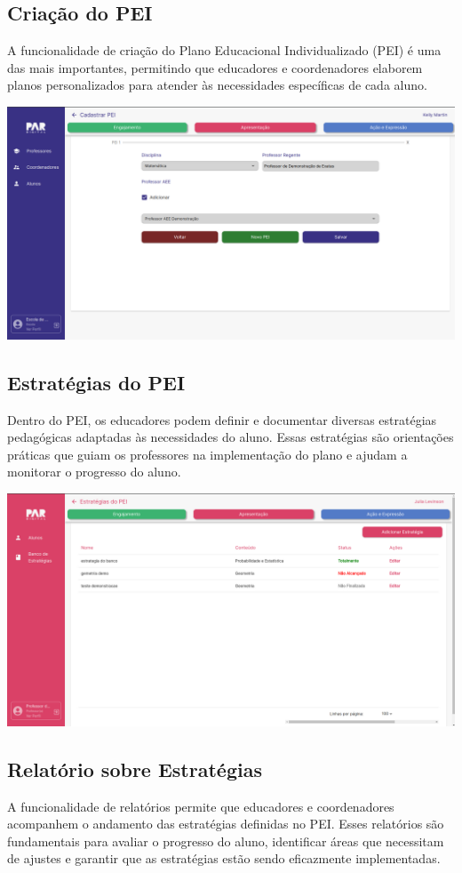 \documentclass[sigconf]{webmedia}
\begin{document}
\subsection{Criação do PEI}
A funcionalidade de criação do Plano Educacional Individualizado
(PEI) é uma das mais importantes, permitindo que educadores e 
coordenadores elaborem planos personalizados para atender às 
necessidades específicas de cada aluno.
\vspace{0.5cm}

\includegraphics[scale=0.12]{./imgs/pei}


\subsection{Estratégias do PEI}
Dentro do PEI, os educadores podem definir e documentar diversas 
estratégias pedagógicas adaptadas às necessidades do aluno. Essas 
estratégias são orientações práticas que guiam os professores na 
implementação do plano e ajudam a monitorar o progresso do aluno.
\vspace{0.5cm}

\includegraphics[scale=0.12]{./imgs/estrategia}

\subsection{Relatório sobre Estratégias}
A funcionalidade de relatórios permite que educadores e coordenadores 
acompanhem o andamento das estratégias definidas no PEI. 
Esses relatórios são fundamentais para avaliar o progresso do aluno, 
identificar áreas que necessitam de ajustes e garantir que as 
estratégias estão sendo eficazmente implementadas.
\vspace{0.5cm}
\end{document}
